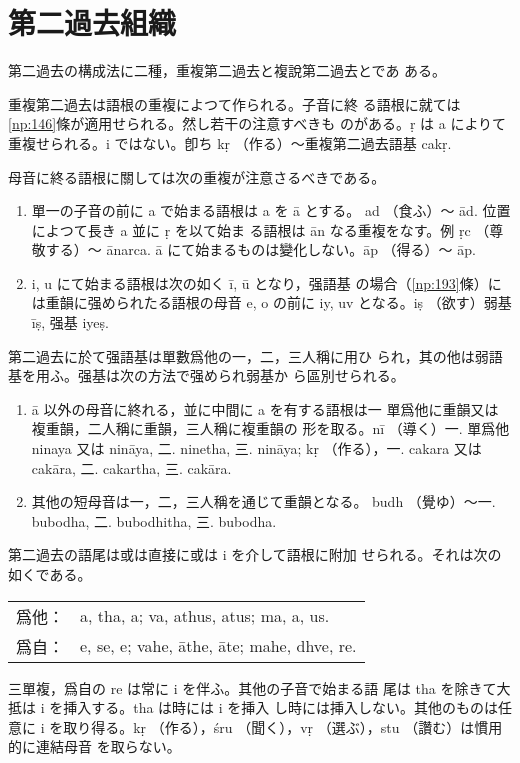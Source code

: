 \section{第二過去組織}
第二過去の構成法に二種，重複第二過去と複說第二過去とであ
ある。

\numberParagraph \label{np:192}
重複第二過去は語根の重複によつて作られる。子音に終
る語根に就ては \ref{np:146}條が適用せられる。然し若干の注意すべきも
のがある。ṛ は a によりて重複せられる。i ではない。卽ち kṛ
（作る）～重複第二過去語基 cakṛ.

母音に終る語根に關しては次の重複が注意さるべきである。
\begin{enumerate}[label=(\alph*)]
\item 單一の子音の前に a で始まる語根は a を ā とする。
ad （食ふ）～ ād. 位置によつて長き a 並に ṛ を以て始ま
る語根は ān なる重複をなす。例 ṛc （尊敬する）～ ānarca.
ā にて始まるものは變化しない。āp （得る）～ āp.
\item i, u にて始まる語根は次の如く ī, ū となり，强語基
の場合（\ref{np:193}條）には重韻に强められたる語根の母音 e, o
の前に iy, uv となる。iṣ （欲す）弱基 īṣ, 强基 iyeṣ.
\end{enumerate}

\numberParagraph \label{np:193}
第二過去に於て强語基は單數爲他の一，二，三人稱に用ひ
られ，其の他は弱語基を用ふ。强基は次の方法で强められ弱基か
ら區別せられる。
\begin{enumerate}[label=(\alph*)]
\item ā 以外の母音に終れる，並に中間に a を有する語根は一
單爲他に重韻又は複重韻，二人稱に重韻，三人稱に複重韻の
形を取る。nī （導く）一. 單爲他 ninaya 又は nināya, 二.
ninetha, 三. nināya; kṛ （作る），一. cakara 又は
cakāra, 二. cakartha, 三. cakāra.
\item 其他の短母音は一，二，三人稱を通じて重韻となる。
budh （覺ゆ）～一. bubodha, 二. bubodhitha, 三. bubodha.
\end{enumerate}

\numberParagraph \label{np:194}
第二過去の語尾は或は直接に或は i を介して語根に附加
せられる。それは次の如くである。

\begin{tabular}{ll}
  爲他： & a, tha, a; va, athus, atus; ma, a, us. \\
  爲自： & e, se, e; vahe, āthe, āte; mahe, dhve, re.
\end{tabular}

三單複，爲自の re は常に i を伴ふ。其他の子音で始まる語
尾は tha を除きて大抵は i を挿入する。tha は時には i を挿入
し時には挿入しない。其他のものは任意に i を取り得る。kṛ
（作る），śru （聞く），vṛ （選ぶ），stu （讚む）は慣用的に連結母音
を取らない。


